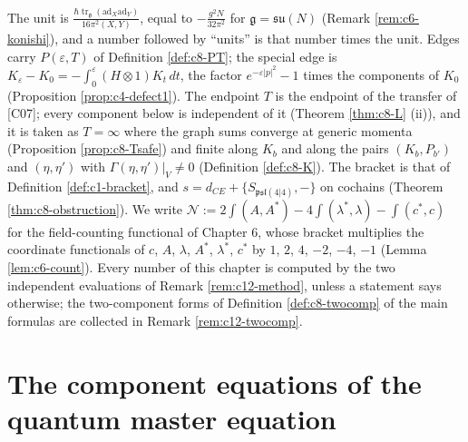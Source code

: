 The unit is $\frac{\hbar\operatorname{tr}_{\mathfrak g}(\mathrm{ad}_X\mathrm{ad}_Y)}{16\pi^2(X,Y)}$, equal to $-\frac{g^2N}{32\pi^2}$ for $\mathfrak g=\mathfrak{su}(N)$ (Remark \ref{rem:c6-konishi}), and a number followed by ``units'' is that number times the unit. Edges carry $P(\varepsilon,T)$ of Definition \ref{def:c8-PT}; the special edge is $K_\varepsilon-K_0=-\int_0^\varepsilon(H\otimes1)K_t\,dt$, the factor $e^{-\varepsilon|p|^2}-1$ times the components of $K_0$ (Proposition \ref{prop:c4-defect1}). The endpoint $T$ is the endpoint of the transfer of [C07]; every component below is independent of it (Theorem \ref{thm:c8-L} (ii)), and it is taken as $T=\infty$ where the graph sums converge at generic momenta (Proposition \ref{prop:c8-Tsafe}) and finite along $K_b$ and along the pairs $(K_b,P_{b'})$ and $(\eta,\eta')$ with $\Gamma(\eta,\eta')|_V\neq0$ (Definition \ref{def:c8-K}). The bracket is that of Definition \ref{def:c1-bracket}, and $s=d_{CE}+\{S_{\mathfrak{psl}(4|4)},-\}$ on cochains (Theorem \ref{thm:c8-obstruction}). We write $\mathcal N:=2\int(A,A^*)-4\int(\lambda^*,\lambda)-\int(c^*,c)$ for the field-counting functional of Chapter 6, whose bracket multiplies the coordinate functionals of $c$, $A$, $\lambda$, $A^*$, $\lambda^*$, $c^*$ by $1$, $2$, $4$, $-2$, $-4$, $-1$ (Lemma \ref{lem:c6-count}). Every number of this chapter is computed by the two independent evaluations of Remark \ref{rem:c12-method}, unless a statement says otherwise; the two-component forms of Definition \ref{def:c8-twocomp} of the main formulas are collected in Remark \ref{rem:c12-twocomp}.

\section{The component equations of the quantum master equation}

